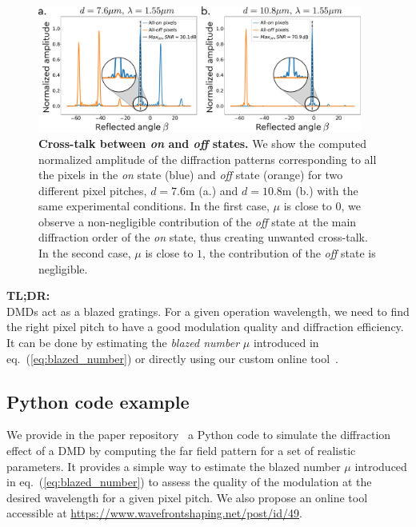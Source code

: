 \documentclass[12pt]{iopart}
\begin{document}
\begin{figure}
  \centering
  \includegraphics[width = 0.95\textwidth]{images/xtalk.pdf}
  \caption{
    \textbf{Cross-talk between {\em on} and {\em off} states.}
    We show the computed normalized amplitude of the diffraction patterns corresponding
    to all the pixels in the {\em on} state (blue)
    and {\em off} state (orange)
    for two different pixel pitches,
    $d = 7.6$\textmu m (a.)
    and $d = 10.8$\textmu m (b.)
    with the same experimental conditions.
    In the first case, $\mu$ is close to $0$,
    we observe a non-negligible contribution of the {\em off} state
    at the main diffraction order of the {\em on} state,
    thus creating unwanted cross-talk.
    In the second case, $\mu$ is close to $1$,
    the contribution of the {\em off} state is negligible.
  }
  \label{fig:xtalk}
\end{figure}


\begin{tldr}
  \textbf{TL;DR:}\\
  DMDs act as a blazed gratings.
  For a given operation wavelength,
  we need to find the right pixel pitch
  to have a good modulation quality
  and diffraction efficiency.
  It can be done by estimating the \textit{blazed number} $\mu$ introduced in eq.~(\ref{eq:blazed_number})
  or directly using our custom online tool~\cite{popoffDMDDiffractionTool}.
\end{tldr}


\subsection{Python code example}

We provide in the paper repository~\cite{github} a Python code
to simulate the diffraction effect of a DMD
by computing the far field pattern for a set of realistic parameters.
It provides a simple way to estimate the blazed number $\mu$ introduced in eq.~(\ref{eq:blazed_number})
to assess the quality of the modulation at the desired wavelength
for a given pixel pitch.
We also propose an online tool accessible at
\url{https://www.wavefrontshaping.net/post/id/49}.
\end{document}
